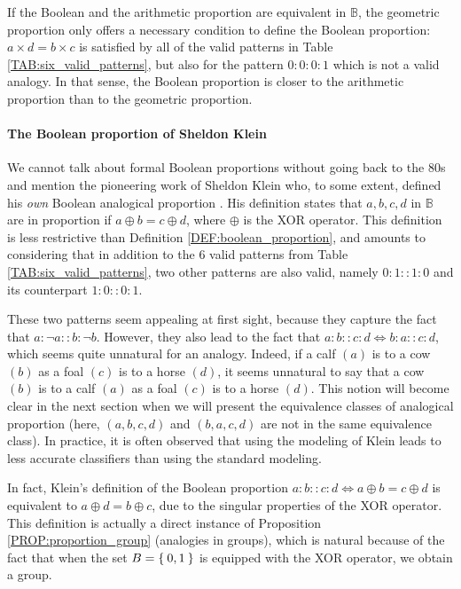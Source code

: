 If the Boolean and the arithmetic proportion are equivalent in $\mathbb{B}$, the
geometric proportion only offers a necessary condition to define the Boolean
proportion: $a \times d = b\times c$ is satisfied by all of the valid patterns
in Table \ref{TAB:six_valid_patterns}, but also for the pattern $0: 0: 0: 1$
which is not a valid analogy. In that sense, the Boolean proportion is closer
to the arithmetic proportion than to the geometric proportion.

\paragraph{The Boolean proportion of Sheldon Klein\\}

We cannot talk about formal Boolean proportions without going back to the 80s
and mention the pioneering work of Sheldon Klein who, to some extent, defined
his \textit{own} Boolean analogical proportion \cite{Kle83}. His definition
states that $a, b, c, d$ in $\mathbb{B}$ are in proportion if $a \oplus b = c
\oplus d$, where $\oplus$ is the XOR operator.  This definition is less
restrictive than Definition \ref{DEF:boolean_proportion}, and amounts to
considering that in addition to the $6$ valid patterns from Table
\ref{TAB:six_valid_patterns}, two other patterns are also valid, namely
$0:1::1:0$ and its counterpart $1:0::0:1$.

These two patterns seem appealing at first sight, because they capture the fact
that $a : \neg a :: b : \neg b$. However, they also lead to the fact that
$a:b::c:d \iff b : a :: c :d$, which seems quite unnatural for an analogy.
Indeed, if a calf $(a)$ is to a cow $(b)$ as a foal $(c)$ is to a horse $(d)$,
it seems unnatural to say that a cow $(b)$ is to a calf $(a)$ as a foal $(c)$
is to a horse $(d)$. This notion will become clear in the next section when we
will present the equivalence classes of analogical proportion (here, $(a, b, c,
d)$ and $(b, a, c, d)$ are not in the same equivalence class).  In practice, it
is often observed that using the modeling of Klein leads to less accurate
classifiers than using the standard modeling.

In fact, Klein's definition of the Boolean proportion $a:b::c:d \iff a
\oplus b = c \oplus d$ is equivalent to $a \oplus d = b \oplus c$, due to the
singular properties of the XOR operator. This definition is actually a direct
instance of Proposition \ref{PROP:proportion_group} (analogies in groups), which
is natural because of the fact that when the set $B = \Set{0, 1}$ is equipped
with the XOR operator, we obtain a group.

